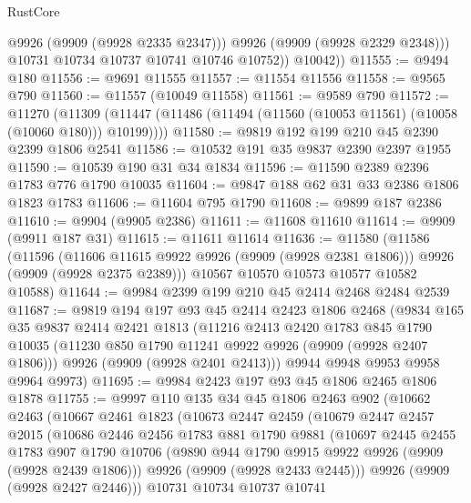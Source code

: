 \begin{lexlean}{RustCore}
\begin{coremodule}
                @9926
                (@9909 (@9928 @2335 @2347)))
              @9926
              (@9909 (@9928 @2329 @2348)))
            @10731
            @10734
            @10737
            @10741
            @10746
            @10752))
        @10042))
@11555 := @9494 @180
@11556 := @9691 @11555
@11557 := @11554 @11556
@11558 := @9565 @790
@11560 := @11557 (@10049 @11558)
@11561 := @9589 @790
@11572 := @11270
    (@11309 (@11447 (@11486 (@11494 (@11560 (@10053 @11561) (@10058 (@10060 @180))) @10199))))
@11580 := @9819 @192 @199 @210 @45 @2390 @2399 @1806 @2541
@11586 := @10532 @191 @35 @9837 @2390 @2397 @1955
@11590 := @10539 @190 @31 @34 @1834
@11596 := @11590 @2389 @2396 @1783 @776 @1790 @10035
@11604 := @9847 @188 @62 @31 @33 @2386 @1806 @1823 @1783
@11606 := @11604 @795 @1790
@11608 := @9899 @187 @2386
@11610 := @9904 (@9905 @2386)
@11611 := @11608 @11610
@11614 := @9909 (@9911 @187 @31)
@11615 := @11611 @11614
@11636 := @11580
    (@11586
      (@11596
        (@11606 @11615 @9922 @9926 (@9909 (@9928 @2381 @1806)))
        @9926
        (@9909 (@9928 @2375 @2389)))
      @10567
      @10570
      @10573
      @10577
      @10582
      @10588)
@11644 := @9984 @2399 @199 @210 @45 @2414 @2468 @2484 @2539
@11687 := @9819
    @194
    @197
    @93
    @45
    @2414
    @2423
    @1806
    @2468
    (@9834
      @165
      @35
      @9837
      @2414
      @2421
      @1813
      (@11216
        @2413
        @2420
        @1783
        @845
        @1790
        @10035
        (@11230 @850 @1790 @11241 @9922 @9926 (@9909 (@9928 @2407 @1806)))
        @9926
        (@9909 (@9928 @2401 @2413)))
      @9944
      @9948
      @9953
      @9958
      @9964
      @9973)
@11695 := @9984 @2423 @197 @93 @45 @1806 @2465 @1806 @1878
@11755 := @9997
    @110
    @135
    @34
    @45
    @1806
    @2463
    @902
    (@10662
      @2463
      (@10667
        @2461
        @1823
        (@10673
          @2447
          @2459
          (@10679
            @2447
            @2457
            @2015
            (@10686
              @2446
              @2456
              @1783
              @881
              @1790
              @9881
              (@10697
                @2445
                @2455
                @1783
                @907
                @1790
                @10706
                (@9890 @944 @1790 @9915 @9922 @9926 (@9909 (@9928 @2439 @1806)))
                @9926
                (@9909 (@9928 @2433 @2445)))
              @9926
              (@9909 (@9928 @2427 @2446)))
            @10731
            @10734
            @10737
            @10741

\end{coremodule}
\end{lexlean}
